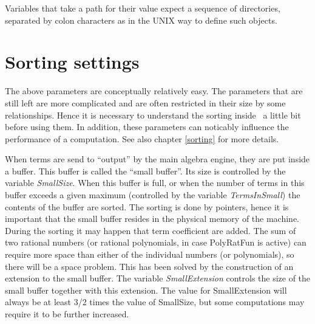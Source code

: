 

Variables that take a path for their value expect a sequence of 
directories, separated by colon characters as in the UNIX way 
to define such objects.

\section{Sorting settings}

The above parameters are conceptually relatively easy. The parameters that 
are still left are more complicated and are often restricted in their 
size by some relationships. Hence it is necessary to understand the 
sorting inside \FORM\ a little bit before using them. In addition,
these parameters can noticably influence the performance of a computation.
See also chapter \ref{sorting} for more details.

When terms are send to ``output'' by the main algebra engine, they are put 
inside a buffer. This buffer is called the ``small 
buffer''. Its size is controlled by the variable {\sl 
SmallSize}. When this buffer is full, or when the number 
of terms in this buffer exceeds a given maximum (controlled by the variable 
{\sl TermsInSmall}) the contents of the buffer are 
sorted. The sorting is done by pointers, hence it is important that the 
small buffer resides in the physical memory of the machine. During the sorting it may 
happen that term coefficient are added. The sum of two rational numbers (or
rational polynomials, in case PolyRatFun is active) can 
require more space than either of the individual numbers (or polynomials),
so there will be a 
space problem. This has been solved by the construction of an extension to 
the small buffer. The variable {\sl SmallExtension} 
controls the size of the small buffer together with this extension. The value for 
SmallExtension will always be at least 3/2 times the value of SmallSize,
but some computations may require it to be further increased.

